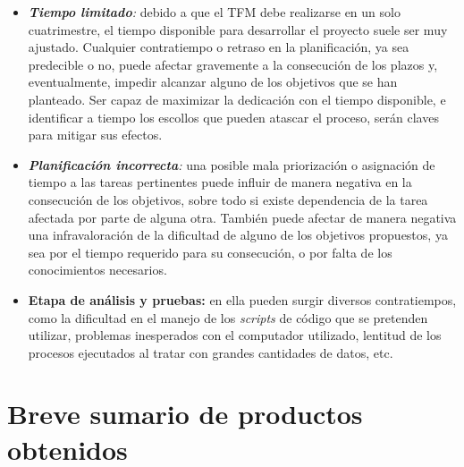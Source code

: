 \documentclass[IB,BIB]{TFUOC}%
\begin{document}
\begin{itemize}
\item \textit{\textbf{Tiempo limitado}:} debido a que el TFM debe realizarse en un solo cuatrimestre, el tiempo disponible para desarrollar el proyecto suele ser muy ajustado. Cualquier contratiempo o retraso en la planificación, ya sea predecible o no, puede afectar gravemente a la consecución de los plazos y, eventualmente, impedir alcanzar alguno de los objetivos que se han planteado. Ser capaz de maximizar la dedicación con el tiempo disponible, e identificar a tiempo los escollos que pueden atascar el proceso, serán claves para mitigar sus efectos.
\item \textit{\textbf{Planificación incorrecta}:} una posible mala priorización o asignación de tiempo a las tareas pertinentes puede influir de manera negativa en la consecución de los objetivos, sobre todo si existe dependencia de la tarea afectada por parte de alguna otra. También puede afectar de manera negativa una infravaloración de la dificultad de alguno de los objetivos propuestos, ya sea por el tiempo requerido para su consecución, o por falta de los conocimientos necesarios.
\item \textbf{Etapa de análisis y pruebas:} en ella pueden surgir diversos contratiempos, como la dificultad en el manejo de los \textit{scripts} de código que se pretenden utilizar, problemas inesperados con el computador utilizado, lentitud de los procesos ejecutados al tratar con grandes cantidades de datos, etc.
\end{itemize}

\normalsize


\section{Breve sumario de productos obtenidos}
\label{sec:Breve sumario de productos obtenidos}


\end{document}

